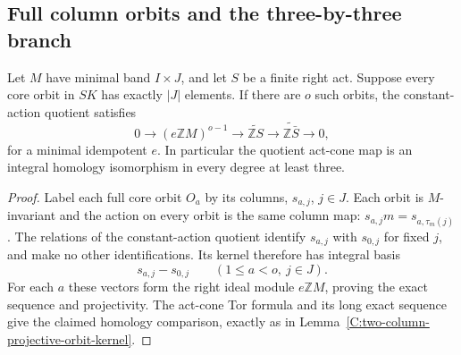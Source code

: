 \subsection{Full column orbits and the three-by-three branch}

\begin{lemma}
\label{C:full-column-orbit-kernel}
Let $M$ have minimal band $I\times J$, and let $S$ be a finite
right act.  Suppose every core orbit in $SK$ has exactly $|J|$
elements.  If there are $o$ such orbits, the constant-action
quotient satisfies
\[
 0\longrightarrow(e\mathbb ZM)^{o-1}
 \longrightarrow\widetilde{\mathbb ZS}
 \longrightarrow\widetilde{\mathbb Z\bar S}
 \longrightarrow0,
\]
for a minimal idempotent $e$.  In particular the quotient
act-cone map is an integral homology isomorphism in every
degree at least three.
\end{lemma}
\begin{proof}
Label each full core orbit $O_a$ by its columns,
$s_{a,j}$, $j\in J$.  Each orbit is $M$-invariant and the
action on every orbit is the same column map:
$s_{a,j}m=s_{a,\tau_m(j)}$.
The relations of the constant-action quotient identify
$s_{a,j}$ with $s_{0,j}$ for fixed $j$, and make no other
identifications.  Its kernel therefore has integral basis
\[
 s_{a,j}-s_{0,j}\qquad(1\leq a<o,\ j\in J).
\]
For each $a$ these vectors form the right ideal module
$e\mathbb ZM$, proving the exact sequence and projectivity.
The act-cone Tor formula and its long exact sequence give the
claimed homology comparison, exactly as in
Lemma~\ref{C:two-column-projective-orbit-kernel}.
\end{proof}

